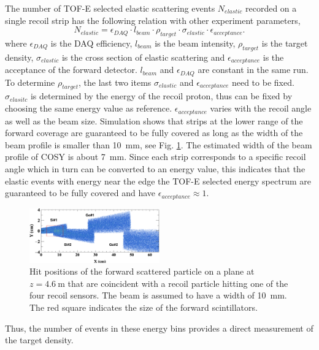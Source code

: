 \documentclass[fleqn,twocolumn,a4paper]{ikpar}
\begin{document}
\par
\medskip

The number of TOF-E selected elastic scattering events $N_{elastic}$ recorded on a single recoil strip has the
following relation with other experiment parameters,
\begin{equation}
  N_{elastic} = \epsilon_{DAQ}\cdot l_{beam}\cdot\rho_{target}\cdot\sigma_{elastic}\cdot\epsilon_{acceptance}.
\end{equation}
where $\epsilon_{DAQ}$ is the DAQ efficiency, $l_{beam}$ is the beam intensity, $\rho_{target}$ is the target density,
$\sigma_{elastic}$ is the cross section of elastic scattering and
$\epsilon_{acceptance}$ is the acceptance of the forward detector.
$l_{beam}$ and $\epsilon_{DAQ}$ are constant in the same run.
To determine $\rho_{target}$, the last two items $\sigma_{elastic}$ and
$\epsilon_{acceptance}$ need to be fixed.
$\sigma_{elasitc}$ is determined by the energy of the recoil proton, thus can be
fixed by choosing the same energy value as reference.
$\epsilon_{acceptance}$ varies with the recoil angle as well as the beam size.
Simulation shows that strips at the lower range of the forward coverage are
guaranteed to be fully covered as long as the width of the beam profile is
smaller than \SI{10}{\mm}, see Fig. \ref{fig:fwd_acceptance}.
The estimated width of the beam profile of COSY is about \SI{7}{\mm}.
Since each strip corresponds to a specific recoil angle which in turn
can be converted to an energy value, this indicates that the elastic events with
energy near the edge the TOF-E selected energy spectrum are guaranteed to be
fully covered and have $\epsilon_{acceptance} \approx 1$.
\begin{figure}[t!]
  \centering
	\includegraphics[width=0.5\textwidth]{./fwd_acceptance.png}
  \caption{
    Hit positions of the forward scattered particle on a plane at
    $z=\SI{4.6}{\m}$ that are coincident with a recoil particle hitting one of
    the four recoil sensors. The beam is assumed to have a width of \SI{10}{\mm}.
     The red square indicates the size of the forward scintillators.}
  \label{fig:fwd_acceptance}
\end{figure}
Thus, the number of events in these energy bins provides a direct measurement of the target density.
\end{document}
